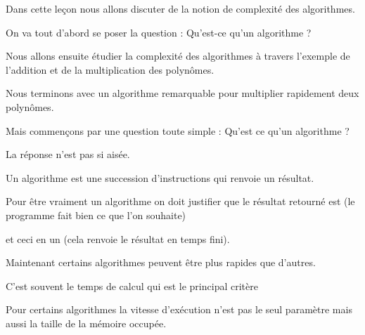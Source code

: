 






\debuttexte

\diapo

\change

Dans cette leçon nous allons discuter de la notion de complexité des algorithmes.

\change


On va tout d'abord se poser la question : Qu'est-ce qu'un algorithme ?


\change


Nous allons ensuite étudier la complexité des algorithmes à travers l'exemple 
de l'addition et de la multiplication  des polynômes.


\change

Nous terminons avec un algorithme remarquable pour multiplier rapidement deux polynômes.

\diapo


Mais commençons par une question toute simple : Qu'est ce qu'un algorithme ?


\change

La réponse n'est pas si aisée.

Un algorithme est une succession d'instructions qui renvoie un résultat. 

\change

Pour être vraiment un algorithme on doit 
justifier que le résultat retourné est  
(le programme fait bien ce que l'on souhaite)

\change



et ceci en un  (cela renvoie le résultat en temps fini).

\change


Maintenant certains algorithmes peuvent être plus rapides que d'autres. 


\change


C'est souvent le temps de calcul qui est le
principal critère

\change



Pour certains algorithmes la vitesse d’exécution n'est pas le seul paramètre mais aussi la taille 
de la mémoire occupée.



